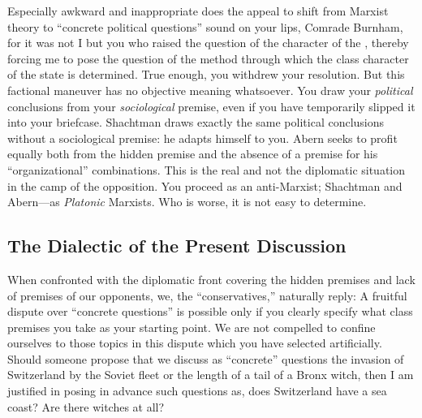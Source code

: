 Especially awkward and inappropriate does the appeal to shift from Marxist theory to “concrete political questions” sound on your lips, Comrade Burnham, for it was not I but you who raised the question of the character of the \USSR, thereby forcing me to pose the question of the method through which the class character of the state is determined. True enough, you withdrew your resolution. But this factional maneuver has no objective meaning whatsoever. You draw your \emph{political} conclusions from your \emph{sociological} premise, even if you have temporarily slipped it into your briefcase. Shachtman draws exactly the same political conclusions without a sociological premise: he adapts himself to you. Abern seeks to profit equally both from the hidden premise and the absence of a premise for his “organizational” combinations. This is the real and not the diplomatic situation in the camp of the opposition. You proceed as an anti-Marxist; Shachtman and Abern---as \emph{Platonic} Marxists. Who is worse, it is not easy to determine.

\subsection*{The Dialectic of the Present Discussion}

When confronted with the diplomatic front covering the hidden premises and lack of premises of our opponents, we, the “conservatives,” naturally reply: A fruitful dispute over “concrete questions” is possible only if you clearly specify what class premises you take as your starting point. We are not compelled to confine ourselves to those topics in this dispute which you have selected artificially. Should someone propose that we discuss as “concrete” questions the invasion of Switzerland by the Soviet fleet or the length of a tail of a Bronx witch, then I am justified in posing in advance such questions as, does Switzerland have a sea coast? Are there witches at all?

